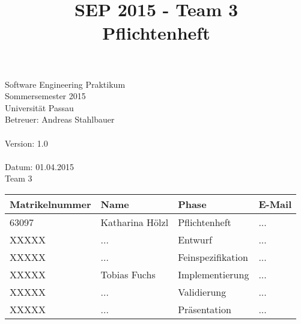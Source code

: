 \documentclass[a4paper]{scrreprt}
\begin{document}
	\thispagestyle{plain}

\begin{titlepage}
    \begin{center}

    	\begin{title}
        	\title{\Huge{\textbf{SEP 2015 - Team 3 \\ Pflichtenheft\\}}}

		\end{title}
		\hspace{3cm}

        	Software Engineering Praktikum \\
        	Sommersemester 2015\\
        	Universität Passau\\


        	Betreuer: Andreas Stahlbauer \\
        	\hspace{1,5cm}\\
        	Version: 1.0 \\
        	\hspace{1,5cm}\\
        	Datum: 01.04.2015\\[50pt]
        	Team 3 \\
    
        
        \begin{tabular}{ | l | l | l | l |}
            \hline
            \textbf{Matrikelnummer} & \textbf{Name} & \textbf{Phase} & \textbf{E-Mail}  \\ \hline
            63097 & Katharina Hölzl & Pflichtenheft & ... \\ \hline
            XXXXX & ... & Entwurf & ...  \\ \hline
            XXXXX & ... & Feinspezifikation  & ... \\ \hline
            XXXXX & Tobias Fuchs & Implementierung  &  ... \\ \hline
            XXXXX & ... & Validierung & ... \\ \hline  
            XXXXX & ... &  Präsentation & ... \\ \hline
        \end{tabular}
    \end{center}
\end{titlepage}
 
 

\tableofcontents
 
\printglossaries
\end{document}
